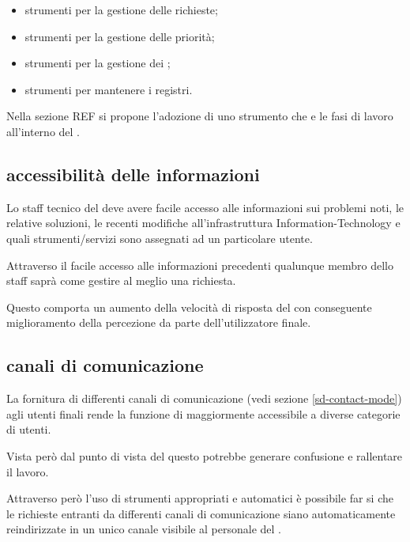 \begin{itemize}
\item{strumenti per la gestione delle richieste;}
\item{strumenti per la gestione delle priorità;}
\item{strumenti per la gestione dei ;}
\item{strumenti per mantenere i registri.}
\end{itemize}

Nella sezione REF si propone l'adozione di uno strumento  che  e  le fasi di lavoro all'interno del .

\subsection[Accessibilità delle informazioni]{accessibilità delle informazioni}
\label{sd-users-experience-accessibility}
Lo staff tecnico del  deve avere facile accesso alle informazioni sui problemi noti, le relative soluzioni, le recenti modifiche all'infrastruttura \acs{Information-Technology} e quali strumenti/servizi sono assegnati ad un particolare utente.

Attraverso il facile accesso alle informazioni precedenti qualunque membro dello staff saprà come gestire al meglio una richiesta.

Questo comporta un aumento della velocità di risposta del  con conseguente miglioramento della percezione da parte dell'utilizzatore finale.

\subsection[Canali di comunicazione]{canali di comunicazione}
\label{sd-users-experience-communication}
La fornitura di differenti canali di comunicazione (vedi sezione \ref{sd-contact-mode}) agli utenti finali rende la funzione di  maggiormente accessibile a diverse categorie di utenti.

Vista però dal punto di vista del  questo potrebbe generare confusione e rallentare il lavoro.

Attraverso però l'uso di strumenti appropriati e automatici è possibile far si che le richieste entranti da differenti canali di comunicazione siano automaticamente reindirizzate in un unico canale visibile al personale del .

